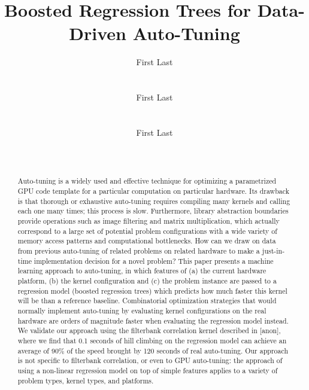 \documentclass{sig-alternate}
\title{Boosted Regression Trees for Data-Driven Auto-Tuning}
\author{
\alignauthor First Last\\
\affaddr{Affiliation line 1}\\
\affaddr{Affiliation line 2}\\
\email{anon@mail.com}
\alignauthor First Last\\
\affaddr{Affiliation line 1}\\
\affaddr{Affiliation line 2}\\
\email{anon@mail.com}
\alignauthor First Last\\
\affaddr{Affiliation line 1}\\
\affaddr{Affiliation line 2}\\
\email{anon@mail.com}
}
\begin{document}
\maketitle

\begin{abstract}
Auto-tuning is a widely used and effective technique for optimizing a
parametrized GPU code template for a particular computation on
particular hardware.
Its drawback is that thorough or exhaustive auto-tuning requires compiling
many kernels and calling each one many times; this process is slow.
Furthermore, library abstraction boundaries provide operations such as image
filtering and matrix multiplication, which actually correspond to a large set
of potential problem configurations with a wide variety of memory
access patterns and computational bottlenecks.
How can we draw on data from previous auto-tuning of related problems on related hardware to make a
just-in-time implementation decision for a novel problem?
This paper presents a machine learning approach to auto-tuning, in
which features of
(a) the current hardware platform,
(b) the kernel configuration
and (c) the problem instance are passed to a regression model (boosted
regression trees) which predicts
how much faster this kernel will be than a reference baseline.
Combinatorial optimization strategies that would normally implement
auto-tuning by evaluating kernel configurations on the real hardware are
orders of magnitude faster when evaluating the regression model instead.
We validate our approach using the filterbank correlation kernel described in
[anon], where we find that 0.1 seconds of hill climbing on the regression
model can achieve an average of
90\% of the speed brought by 120 seconds of real auto-tuning.
Our approach is not specific to filterbank correlation, or even to GPU auto-tuning: the approach of using a non-linear regression model on top of simple features applies to a variety of problem types, kernel types, and platforms.
\end{abstract}
\end{document}
